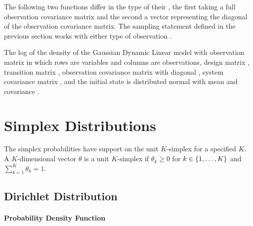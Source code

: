 The following two functions differ in the type of their , the
first taking a full observation covariance matrix  and the
second a vector  representing the diagonal of the observation
covariance matrix.  The sampling statement defined in the previous
section works with either type of observation .

\begin{description}
%
% 
%
 {The log of the density of the Gaussian Dynamic
  Linear model with observation matrix  in which rows are
  variables and columns are observations, design matrix ,
  transition matrix , observation covariance matrix with
  diagonal , system covariance matrix , and the
  initial state is distributed normal with mean  and
  covariance .}
%
\end{description}


\chapter{Simplex Distributions}

\noindent
The simplex probabilities have support on the unit $K$-simplex for a
specified $K$.  A $K$-dimensional vector $\theta$ is a unit
$K$-simplex if $\theta_k \geq 0$ for $k \in \setlist{1,\ldots,K}$ and
$\sum_{k = 1}^K \theta_k = 1$.


\section{Dirichlet Distribution}

\subsubsection{Probability Density Function}

